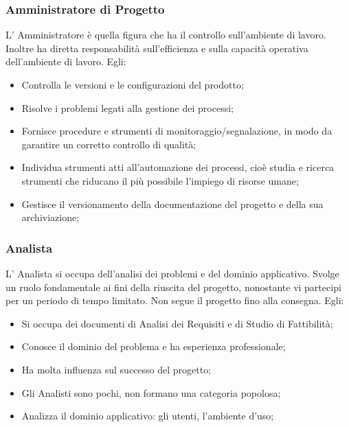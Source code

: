 \subsubsection{Amministratore di Progetto}
L’ Amministratore è quella figura che ha il controllo sull'ambiente di lavoro. Inoltre ha diretta responsabilità sull'efficienza e sulla capacità operativa dell'ambiente di lavoro.
Egli:
\begin{itemize}
\item{Controlla le versioni e le configurazioni del prodotto;}
\item{Risolve i problemi legati alla gestione dei processi;}
\item{Fornisce procedure e strumenti di monitoraggio/segnalazione, in modo da garantire un corretto controllo di qualità;}
\item{Individua strumenti atti all’automazione dei processi, cioè studia e ricerca strumenti che riducano il più possibile l'impiego di risorse umane;}
\item{Gestisce il versionamento della documentazione del progetto e della sua archiviazione;}
\end{itemize}


\subsubsection{Analista}
L’ Analista si occupa dell’analisi dei problemi e del dominio applicativo. Svolge un ruolo fondamentale ai fini della riuscita del progetto, nonostante vi partecipi per un periodo di tempo limitato. Non segue il progetto fino alla consegna.
Egli:
\begin{itemize}
\item{Si occupa dei documenti di Analisi dei Requisiti e di Studio di Fattibilità;}
\item{Conosce il dominio del problema e ha esperienza professionale;}
\item{Ha molta influenza sul successo del progetto;}
\item{Gli Analisti sono pochi, non formano una categoria popolosa;}
\item{Analizza il dominio applicativo:  gli utenti, l’ambiente d’uso;}
\end{itemize}



